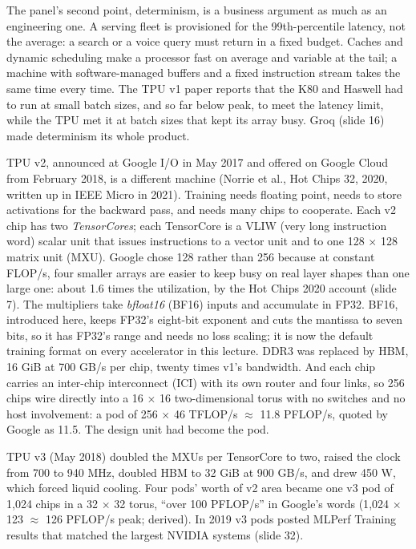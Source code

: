 \documentclass[11pt,letterpaper]{article}
\begin{document}
The panel's second point, determinism, is a business argument as much as an engineering one. A serving fleet is provisioned for the 99th-percentile latency, not the average: a search or a voice query must return in a fixed budget. Caches and dynamic scheduling make a processor fast on average and variable at the tail; a machine with software-managed buffers and a fixed instruction stream takes the same time every time. The TPU v1 paper reports that the K80 and Haswell had to run at small batch sizes, and so far below peak, to meet the latency limit, while the TPU met it at batch sizes that kept its array busy. Groq (slide 16) made determinism its whole product.

TPU v2, announced at Google I/O in May 2017 and offered on Google Cloud from February 2018, is a different machine (Norrie et al., Hot Chips 32, 2020, written up in IEEE Micro in 2021). Training needs floating point, needs to store activations for the backward pass, and needs many chips to cooperate. Each v2 chip has two \emph{TensorCores}; each TensorCore is a VLIW (very long instruction word) scalar unit that issues instructions to a vector unit and to one 128 $\times$ 128 matrix unit (MXU). Google chose 128 rather than 256 because at constant FLOP/s, four smaller arrays are easier to keep busy on real layer shapes than one large one: about 1.6 times the utilization, by the Hot Chips 2020 account (slide 7). The multipliers take \emph{bfloat16} (BF16) inputs and accumulate in FP32. BF16, introduced here, keeps FP32's eight-bit exponent and cuts the mantissa to seven bits, so it has FP32's range and needs no loss scaling; it is now the default training format on every accelerator in this lecture. DDR3 was replaced by HBM, 16 GiB at 700 GB/s per chip, twenty times v1's bandwidth. And each chip carries an inter-chip interconnect (ICI) with its own router and four links, so 256 chips wire directly into a 16 $\times$ 16 two-dimensional torus with no switches and no host involvement: a pod of 256 $\times$ 46 TFLOP/s $\approx$ 11.8 PFLOP/s, quoted by Google as 11.5. The design unit had become the pod.

TPU v3 (May 2018) doubled the MXUs per TensorCore to two, raised the clock from 700 to 940 MHz, doubled HBM to 32 GiB at 900 GB/s, and drew 450 W, which forced liquid cooling. Four pods' worth of v2 area became one v3 pod of 1{,}024 chips in a 32 $\times$ 32 torus, ``over 100 PFLOP/s'' in Google's words (1{,}024 $\times$ 123 $\approx$ 126 PFLOP/s peak; derived). In 2019 v3 pods posted MLPerf Training results that matched the largest NVIDIA systems (slide 32).
\end{document}

